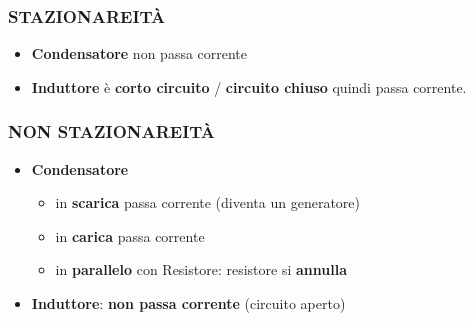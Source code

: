 \documentclass{article}
\begin{document}
\pagebreak

\subsubsection{STAZIONAREITÀ}
\begin{itemize}
  \item \textbf{Condensatore} non passa corrente
  \item \textbf{Induttore} è \textbf{corto circuito} / \textbf{circuito chiuso} quindi passa corrente.
\end{itemize}
\subsubsection{NON STAZIONAREITÀ}
\begin{itemize}
  \item \textbf{Condensatore} 
  \begin{itemize}
    \item in \textbf{scarica} passa corrente (diventa un generatore)
    \item in \textbf{carica} passa corrente
    \item in \textbf{parallelo} con Resistore: resistore si \textbf{annulla}
  \end{itemize}
  \item \textbf{Induttore}: \textbf{non passa corrente} (circuito aperto) 
\end{itemize}
\end{document}
